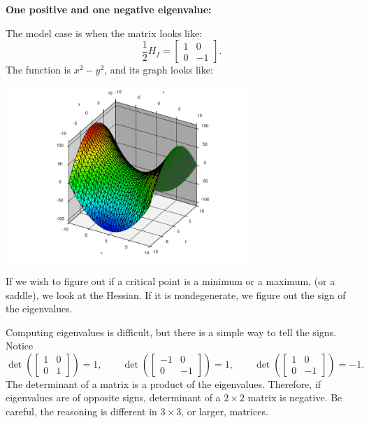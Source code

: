 \documentclass[12pt]{article}
\begin{document}
\bigskip

\pagebreak[2]
\textbf{One positive and one negative eigenvalue:}

The model case is when the matrix looks like:
\begin{equation*}
\frac{1}{2} H_f
=
\begin{bmatrix}
1 & 0 \\
0 & -1
\end{bmatrix} .
\end{equation*}
The function is $x^2-y^2$, and
its graph looks like:
\begin{center}
\includegraphics[width=3.65in]{xsqminusysq}
\end{center}

\bigskip

If we wish to figure out if a critical point is a minimum
or a maximum, (or a saddle), we look at the Hessian.  If it is
nondegenerate, we figure out the sign of the eigenvalues.

Computing eigenvalues is difficult, but there is a simple way to tell
the signs.  Notice
\begin{equation*}
\det\left(
\begin{bmatrix}
1 & 0 \\
0 & 1
\end{bmatrix}
\right) = 1,
\qquad
\det\left(
\begin{bmatrix}
-1 & 0 \\
0 & -1
\end{bmatrix}
\right) = 1,
\qquad
\det\left(
\begin{bmatrix}
1 & 0 \\
0 & -1
\end{bmatrix}
\right) = -1 .
\end{equation*}
The determinant of a matrix is a product of the eigenvalues.  Therefore, if
eigenvalues are of opposite signs, determinant of a $2 \times 2$ matrix is
negative.  Be careful, the reasoning is different in $3 \times 3$, or
larger, matrices.
\end{document}
